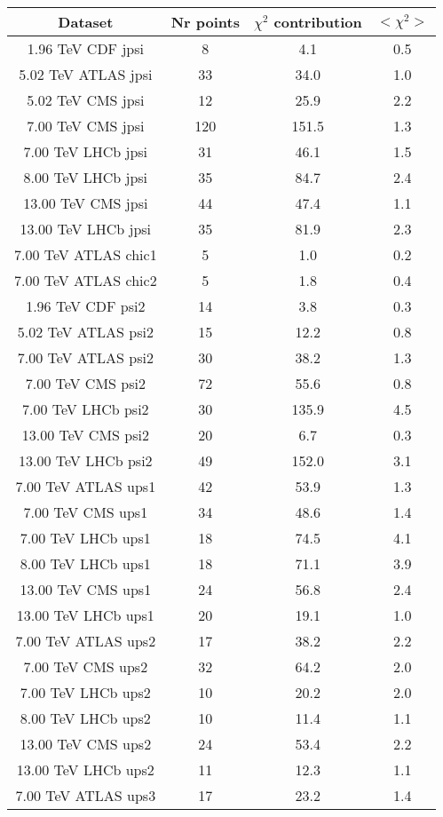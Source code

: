\begin{table}[h!]
\centering
\begin{tabular}{c|c|c|c}
Dataset & Nr points & $\chi^2$ contribution & $<\chi^2>$ \\
\hline
1.96 TeV CDF jpsi & 8 & 4.1 & 0.5 \\
5.02 TeV ATLAS jpsi & 33 & 34.0 & 1.0 \\
5.02 TeV CMS jpsi & 12 & 25.9 & 2.2 \\
7.00 TeV CMS jpsi & 120 & 151.5 & 1.3 \\
7.00 TeV LHCb jpsi & 31 & 46.1 & 1.5 \\
8.00 TeV LHCb jpsi & 35 & 84.7 & 2.4 \\
13.00 TeV CMS jpsi & 44 & 47.4 & 1.1 \\
13.00 TeV LHCb jpsi & 35 & 81.9 & 2.3 \\
7.00 TeV ATLAS chic1 & 5 & 1.0 & 0.2 \\
7.00 TeV ATLAS chic2 & 5 & 1.8 & 0.4 \\
1.96 TeV CDF psi2 & 14 & 3.8 & 0.3 \\
5.02 TeV ATLAS psi2 & 15 & 12.2 & 0.8 \\
7.00 TeV ATLAS psi2 & 30 & 38.2 & 1.3 \\
7.00 TeV CMS psi2 & 72 & 55.6 & 0.8 \\
7.00 TeV LHCb psi2 & 30 & 135.9 & 4.5 \\
13.00 TeV CMS psi2 & 20 & 6.7 & 0.3 \\
13.00 TeV LHCb psi2 & 49 & 152.0 & 3.1 \\
7.00 TeV ATLAS ups1 & 42 & 53.9 & 1.3 \\
7.00 TeV CMS ups1 & 34 & 48.6 & 1.4 \\
7.00 TeV LHCb ups1 & 18 & 74.5 & 4.1 \\
8.00 TeV LHCb ups1 & 18 & 71.1 & 3.9 \\
13.00 TeV CMS ups1 & 24 & 56.8 & 2.4 \\
13.00 TeV LHCb ups1 & 20 & 19.1 & 1.0 \\
7.00 TeV ATLAS ups2 & 17 & 38.2 & 2.2 \\
7.00 TeV CMS ups2 & 32 & 64.2 & 2.0 \\
7.00 TeV LHCb ups2 & 10 & 20.2 & 2.0 \\
8.00 TeV LHCb ups2 & 10 & 11.4 & 1.1 \\
13.00 TeV CMS ups2 & 24 & 53.4 & 2.2 \\
13.00 TeV LHCb ups2 & 11 & 12.3 & 1.1 \\
7.00 TeV ATLAS ups3 & 17 & 23.2 & 1.4 \\

\end{tabular}
\end{table}
